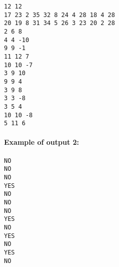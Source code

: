 \begin{verbatim}
12 12
17 23 2 35 32 8 24 4 28 18 4 28
20 19 8 31 34 5 26 3 23 20 2 28
2 6 8
4 4 -10
9 9 -1
11 12 7
10 10 -7
3 9 10
9 9 4
3 9 8
3 3 -8
3 5 4
10 10 -8
5 11 6
\end{verbatim}

\hypertarget{example-of-output-2}{%
\paragraph{Example of output 2:}\label{example-of-output-2}}

\begin{verbatim}
NO
NO
NO
YES
NO
NO
NO
YES
NO
YES
NO
YES
NO 
\end{verbatim}
